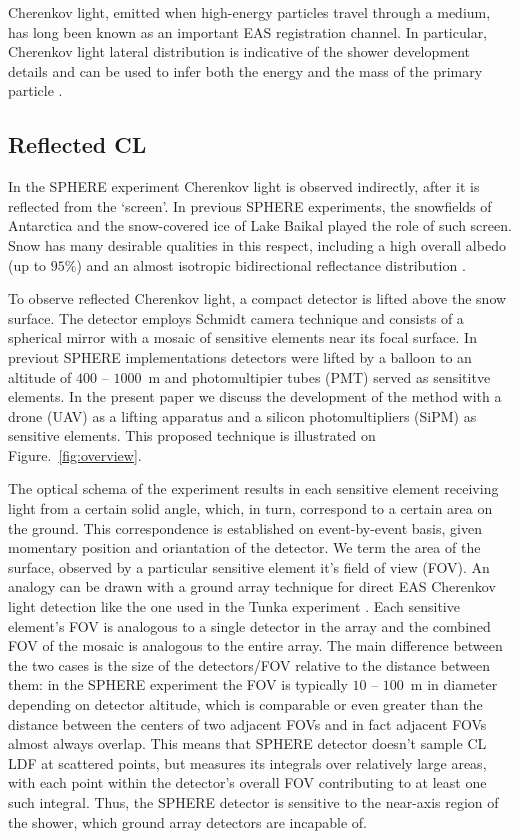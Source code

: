 \documentclass[a4paper,11pt]{article}
\begin{document}
Cherenkov light, emitted when high-energy particles travel through a medium, has long been known as an important EAS registration channel. In particular, Cherenkov light lateral distribution is indicative of the shower development details and can be used to infer both the energy and the mass of the primary particle \citep[e.g.][]{Budnev2013}.

\subsection{Reflected CL}

In the SPHERE experiment Cherenkov light is observed indirectly, after it is reflected from the `screen'. In previous SPHERE experiments, the snowfields of Antarctica and the snow-covered ice of Lake Baikal played the role of such screen. Snow has many desirable qualities in this respect, including a high overall albedo (up to $95\%$) and an almost isotropic bidirectional reflectance distribution \citep{Warren1982}.

To observe reflected Cherenkov light, a compact detector is lifted above the snow surface. The detector employs Schmidt camera technique and consists of a spherical mirror with a mosaic of sensitive elements near its focal surface. In previout SPHERE implementations detectors were lifted by a balloon to an altitude of $400$ -- $1000$~m and photomultipier tubes (PMT) served as sensititve elements. In the present paper we discuss the development of the method with a drone (UAV) as a lifting apparatus and a silicon photomultipliers (SiPM) as sensitive elements. This proposed technique is illustrated on Figure.~\ref{fig:overview}.

The optical schema of the experiment results in each sensitive element receiving light from a certain solid angle, which, in turn, correspond to a certain area on the ground. This correspondence is established on event-by-event basis, given momentary position and oriantation of the detector. We term the area of the surface, observed by a particular sensitive element it's field of view (FOV). An analogy can be drawn with a ground array technique for direct EAS Cherenkov light detection like the one used in the Tunka experiment \citep{Berezhnev2012}. Each sensitive element's FOV is analogous to a single detector in the array and the combined FOV of the mosaic is analogous to the entire array. The main difference between the two cases is the size of the detectors/FOV relative to the distance between them: in the SPHERE experiment the FOV is typically $10$ -- $100$~m in diameter depending on detector altitude, which is comparable or even greater than the distance between the centers of two adjacent FOVs and in fact adjacent FOVs almost always overlap. This means that SPHERE detector doesn't sample CL LDF at scattered points, but measures its integrals over relatively large areas, with each point within the detector's overall FOV contributing to at least one such integral. Thus, the SPHERE detector is sensitive to the near-axis region of the shower, which ground array detectors are incapable of.
\end{document}
